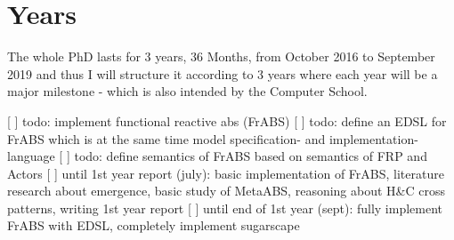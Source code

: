 \section{Years}
The whole PhD lasts for 3 years, 36 Months, from October 2016 to September 2019 and thus I will structure it according to 3 years where each year will be a major milestone - which is also intended by the Computer School.

[ ] todo: implement functional reactive abs (FrABS)
[ ] todo: define an EDSL for FrABS which is at the same time model specification- and implementation-language
[ ] todo: define semantics of FrABS based on semantics of FRP and Actors
[ ] until 1st year report (july): basic implementation of FrABS, literature research about emergence, basic study of MetaABS, reasoning about H&C cross patterns, writing 1st year report
[ ] until end of 1st year (sept): fully implement FrABS with EDSL, completely implement sugarscape







 
